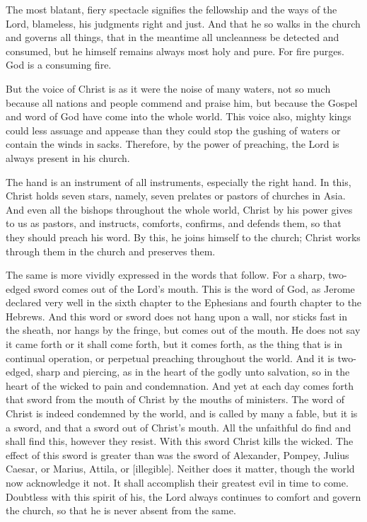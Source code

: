 The most blatant, fiery spectacle signifies the fellowship and the ways of the Lord, blameless, his judgments right and just. And that he so walks in the church and governs all things, that in the meantime all uncleanness be detected and consumed, but he himself remains always most holy and pure. For fire purges. God is a consuming fire.

But the voice of Christ is as it were the noise of many waters, not so much because all nations and people commend and praise him, but because the Gospel and word of God have come into the whole world. This voice also, mighty kings could less assuage and appease than they could stop the gushing of waters or contain the winds in sacks. Therefore, by the power of preaching, the Lord is always present in his church.

The hand is an instrument of all instruments, especially the right hand. In this, Christ holds seven stars, namely, seven prelates or pastors of churches in Asia. And even all the bishops throughout the whole world, Christ by his power gives to us as pastors, and instructs, comforts, confirms, and defends them, so that they should preach his word. By this, he joins himself to the church; Christ works through them in the church and preserves them.

The same is more vividly expressed in the words that follow. For a sharp, two-edged sword comes out of the Lord’s mouth. This is the word of God, as Jerome declared very well in the sixth chapter to the Ephesians and fourth chapter to the Hebrews. And this word or sword does not hang upon a wall, nor sticks fast in the sheath, nor hangs by the fringe, but comes out of the mouth. He does not say it came forth or it shall come forth, but it comes forth, as the thing that is in continual operation, or perpetual preaching throughout the world. And it is two-edged, sharp and piercing, as in the heart of the godly unto salvation, so in the heart of the wicked to pain and condemnation. And yet at each day comes forth that sword from the mouth of Christ by the mouths of ministers. The word of Christ is indeed condemned by the world, and is called by many a fable, but it is a sword, and that a sword out of Christ’s mouth. All the unfaithful do find and shall find this, however they resist. With this sword Christ kills the wicked. The effect of this sword is greater than was the sword of Alexander, Pompey, Julius Caesar, or Marius, Attila, or [illegible]. Neither does it matter, though the world now acknowledge it not. It shall accomplish their greatest evil in time to come. Doubtless with this spirit of his, the Lord always continues to comfort and govern the church, so that he is never absent from the same.

